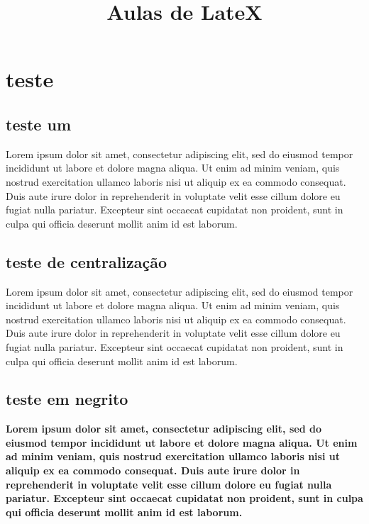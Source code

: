 \documentclass[a4paper, 12pt]{article} %
\begin{document}
\title{Aulas de LateX}
\maketitle %

\section{teste} %
\subsection{teste um} %

Lorem ipsum dolor sit amet, consectetur adipiscing elit, sed do eiusmod tempor incididunt ut labore et dolore magna aliqua. Ut enim ad minim veniam, quis nostrud exercitation ullamco laboris nisi ut aliquip ex ea commodo consequat. Duis aute irure dolor in reprehenderit in voluptate velit esse cillum dolore eu fugiat nulla pariatur. Excepteur sint occaecat cupidatat non proident, sunt in culpa qui officia deserunt mollit anim id est laborum.

\subsection{teste de centralização}
\begin{center}
Lorem ipsum dolor sit amet, consectetur adipiscing elit, sed do eiusmod tempor incididunt ut labore et dolore magna aliqua. Ut enim ad minim veniam, quis nostrud exercitation ullamco laboris nisi ut aliquip ex ea commodo consequat. Duis aute irure dolor in reprehenderit in voluptate velit esse cillum dolore eu fugiat nulla pariatur. Excepteur sint occaecat cupidatat non proident, sunt in culpa qui officia deserunt mollit anim id est laborum.
\end{center} %

\subsection{teste em negrito}
\textbf{Lorem ipsum dolor sit amet, consectetur adipiscing elit, sed do eiusmod tempor incididunt ut labore et dolore magna aliqua. Ut enim ad minim veniam, quis nostrud exercitation ullamco laboris nisi ut aliquip ex ea commodo consequat. Duis aute irure dolor in reprehenderit in voluptate velit esse cillum dolore eu fugiat nulla pariatur. Excepteur sint occaecat cupidatat non proident, sunt in culpa qui officia deserunt mollit anim id est laborum.}
\end{document}
